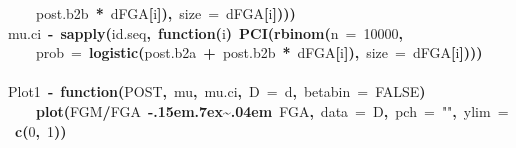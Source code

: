 \documentclass{article}
\makeatletter
\newcommand{\hlnumber}[1]{\textcolor[rgb]{0,0,0}{#1}}%
\newcommand{\hlfunctioncall}[1]{\textcolor[rgb]{.5,0,.33}{\textbf{#1}}}%
\newcommand{\hlstring}[1]{\textcolor[rgb]{.6,.6,1}{#1}}%
\newcommand{\hlkeyword}[1]{\textbf{#1}}%
\newcommand{\hlargument}[1]{\textcolor[rgb]{.69,.25,.02}{#1}}%
\newcommand{\hlformalargs}[1]{\hlargument{#1}}%
\newcommand{\hleqformalargs}[1]{\hlargument{#1}}%
\newcommand{\hlassignement}[1]{\textbf{#1}}%
\newcommand{\hlsymbol}[1]{#1}%
\def\urltilda{\kern -.15em\lower .7ex\hbox{\~{}}\kern .04em}%
\newcommand{\hlstd}[1]{\textcolor[rgb]{0,0,0}{#1}}%
\newenvironment{kframe}{%
 \def\FrameCommand##1{\hskip\@totalleftmargin \hskip-\fboxsep
 \colorbox{shadecolor}{##1}\hskip-\fboxsep
     \hskip-\linewidth \hskip-\@totalleftmargin \hskip\columnwidth}%
 \MakeFramed {\advance\hsize-\width
   \@totalleftmargin\z@ \linewidth\hsize
   \@setminipage}}%
 {\par\unskip\endMakeFramed}
\newenvironment{knitrout}{}{} %
\makeatother
\begin{document}
\begin{knitrout}
{\begin{kframe}
\begin{flushleft}
\hlstd{}{\ }{\ }{\ }{\ }\hlsymbol{post.b2}\hlkeyword{\usebox{\hlnormalsizeboxdollar}}\hlsymbol{b}{\ }\hlkeyword{*}{\ }\hlsymbol{d}\hlkeyword{\usebox{\hlnormalsizeboxdollar}}\hlsymbol{FGA}\hlkeyword{[}\hlsymbol{i}\hlkeyword{]}\hlkeyword{)}\hlkeyword{,}{\ }\hlargument{size}{\ }\hlargument{=}{\ }\hlsymbol{d}\hlkeyword{\usebox{\hlnormalsizeboxdollar}}\hlsymbol{FGA}\hlkeyword{[}\hlsymbol{i}\hlkeyword{]}\hlkeyword{)}\hlkeyword{)}\hlkeyword{)}\hspace*{\fill}\\
\hlstd{}\hlsymbol{mu.ci}{\ }\hlassignement{\usebox{\hlnormalsizeboxlessthan}-}{\ }\hlfunctioncall{sapply}\hlkeyword{(}\hlsymbol{id.seq}\hlkeyword{,}{\ }\hlkeyword{function}\hlkeyword{(}\hlformalargs{i}\hlkeyword{)}{\ }\hlfunctioncall{PCI}\hlkeyword{(}\hlfunctioncall{rbinom}\hlkeyword{(}\hlargument{n}{\ }\hlargument{=}{\ }\hlnumber{10000}\hlkeyword{,}\hspace*{\fill}\\
\hlstd{}{\ }{\ }{\ }{\ }\hlargument{prob}{\ }\hlargument{=}{\ }\hlfunctioncall{logistic}\hlkeyword{(}\hlsymbol{post.b2}\hlkeyword{\usebox{\hlnormalsizeboxdollar}}\hlsymbol{a}{\ }\hlkeyword{+}{\ }\hlsymbol{post.b2}\hlkeyword{\usebox{\hlnormalsizeboxdollar}}\hlsymbol{b}{\ }\hlkeyword{*}{\ }\hlsymbol{d}\hlkeyword{\usebox{\hlnormalsizeboxdollar}}\hlsymbol{FGA}\hlkeyword{[}\hlsymbol{i}\hlkeyword{]}\hlkeyword{)}\hlkeyword{,}{\ }\hlargument{size}{\ }\hlargument{=}{\ }\hlsymbol{d}\hlkeyword{\usebox{\hlnormalsizeboxdollar}}\hlsymbol{FGA}\hlkeyword{[}\hlsymbol{i}\hlkeyword{]}\hlkeyword{)}\hlkeyword{)}\hlkeyword{)}\hspace*{\fill}\\
\hlstd{}\hspace*{\fill}\\
\hlstd{}\hlsymbol{Plot1}{\ }\hlassignement{\usebox{\hlnormalsizeboxlessthan}-}{\ }\hlkeyword{function}\hlkeyword{(}\hlformalargs{POST}\hlkeyword{,}{\ }\hlformalargs{mu}\hlkeyword{,}{\ }\hlformalargs{mu.ci}\hlkeyword{,}{\ }\hlformalargs{D}{\ }\hleqformalargs{=}{\ }\hlsymbol{d}\hlkeyword{,}{\ }\hlformalargs{betabin}{\ }\hleqformalargs{=}{\ }\hlnumber{FALSE}\hlkeyword{)}{\ }\hlkeyword{\usebox{\hlnormalsizeboxopenbrace}}\hspace*{\fill}\\
\hlstd{}{\ }{\ }{\ }{\ }\hlfunctioncall{plot}\hlkeyword{(}\hlsymbol{FGM}\hlkeyword{/}\hlsymbol{FGA}{\ }\hlkeyword{\urltilda{}}{\ }\hlsymbol{FGA}\hlkeyword{,}{\ }\hlargument{data}{\ }\hlargument{=}{\ }\hlsymbol{D}\hlkeyword{,}{\ }\hlargument{pch}{\ }\hlargument{=}{\ }\hlstring{""}\hlkeyword{,}{\ }\hlargument{ylim}{\ }\hlargument{=}{\ }\hlfunctioncall{c}\hlkeyword{(}\hlnumber{0}\hlkeyword{,}{\ }\hlnumber{1}\hlkeyword{)}\hlkeyword{)}\hspace*{\fill}\\

\end{flushleft}
\end{kframe}}
\end{knitrout}
\end{document}
